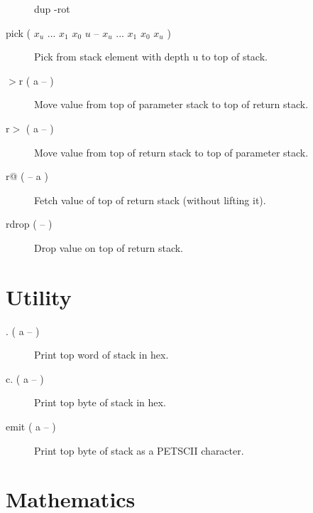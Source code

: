 \begin{description}
dup -rot

\item[pick ( $x_u$ ... $x_1$ $x_0$ $u$ -- $x_u$ ... $x_1$ $x_0$ $x_u$ )]

Pick from stack element with depth u to top of stack.

\item[$>$r ( a -- )]

Move value from top of parameter stack to top of return stack. 

\item[r$>$ ( a -- )]

Move value from top of return stack to top of parameter stack. 

\item[r@ ( -- a )]

Fetch value of top of return stack (without lifting it).

\item[rdrop ( -- )]

Drop value on top of return stack.

\end{description}

\section{Utility}

\begin{description}
\item[. ( a -- )]

Print top word of stack in hex.

\item[c. ( a -- )]

Print top byte of stack in hex.

\item[emit ( a -- )]

Print top byte of stack as a PETSCII character.

\end{description}

\section{Mathematics}

